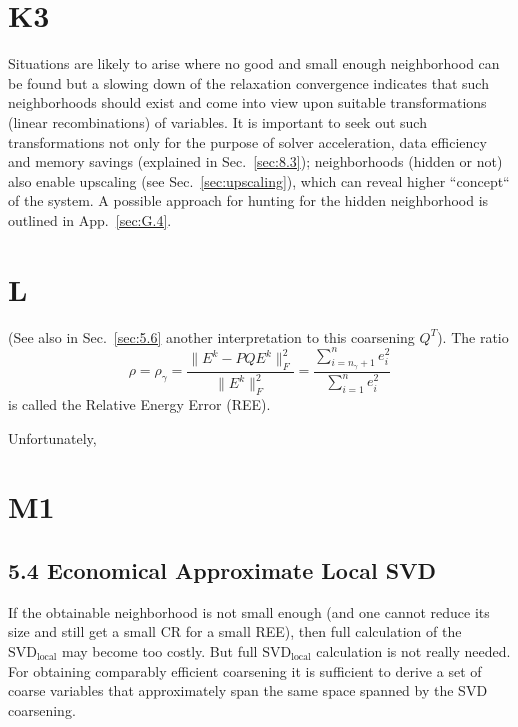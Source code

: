 \documentclass{article} %
\begin{document}
\section{K3}
Situations are likely to arise where no good and small enough neighborhood can be found but a slowing down of the relaxation convergence indicates that such neighborhoods should exist and come into view upon suitable transformations (linear recombinations) of variables. It is important to seek out such transformations not only for the purpose of solver acceleration, data efficiency and memory savings (explained in Sec.~\ref{sec:8.3}); neighborhoods (hidden or not) also enable upscaling (see Sec.~\ref{sec:upscaling}), which can reveal higher ``concept`` of the system. A possible approach for hunting for the hidden neighborhood is outlined in App.~\ref{sec:G.4}.

\section{L}
(See also in Sec.~\ref{sec:5.6} another interpretation to this coarsening $Q^T$). The ratio
\begin{equation}
    \rho = \rho_{\gamma} = \frac{\|E^k - P Q E^k \|^2_F}{\|E^k\|^2_F} =
    \frac{\sum_{i=n_{\gamma}+1}^n e_i^2}{\sum_{i=1}^n e_i^2}
    \label{ree}
\end{equation}
is called the Relative Energy Error (REE).

Unfortunately,

\section{M1}
\subsection{5.4 Economical Approximate Local SVD}
If the obtainable neighborhood is not small enough (and one cannot reduce its size and still get a small CR for a small REE), then full calculation of the $\text{SVD}_{\text{local}}$ may become too costly. But full $\text{SVD}_{\text{local}}$ calculation is not really needed. For obtaining comparably efficient coarsening it is sufficient to derive a set of coarse variables that approximately span the same space spanned by the SVD coarsening.
\end{document}
